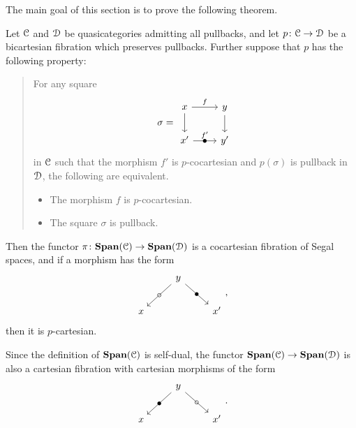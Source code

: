 \documentclass[main.tex]{subfiles}
\begin{document}
The main goal of this section is to prove the following theorem.

\begin{theorem}
  \label{thm:span_of_bicartesian_fibration_is_bicartesian_fibration}
  Let $\mathcal{C}$ and $\mathcal{D}$ be quasicategories admitting all pullbacks, and let $p\colon \mathcal{C} \to \mathcal{D}$ be a bicartesian fibration which preserves pullbacks. Further suppose that $p$ has the following property:

  \begin{quote}
    For any square
    \begin{equation*}
      \sigma =
      \begin{tikzcd}
        x
        \arrow[r, "f"]
        \arrow[d]
        & y
        \arrow[d]
        \\
        x'
        \arrow[r, "f'", "\bullet" marking]
        & y'
      \end{tikzcd}
    \end{equation*}
    in $\mathcal{C}$ such that the morphism $f'$ is $p$-cocartesian and $p(\sigma)$ is pullback in $\mathcal{D}$, the following are equivalent.
    \begin{itemize}
      \item The morphism $f$ is $p$-cocartesian.

      \item The square $\sigma$ is pullback.
    \end{itemize}
  \end{quote}

  Then the functor $\pi\colon \mathbf{Span}(\mathcal{C}) \to \mathbf{Span}(\mathcal{D})$ is a cocartesian fibration of Segal spaces, and if a morphism has the form
  \begin{equation*}
    \begin{tikzcd}
      & y
      \arrow[dl, "\circ" marking]
      \arrow[dr, "\bullet" marking]
      \\
      x
      && x'
    \end{tikzcd},
  \end{equation*}
  then it is $p$-cartesian.
\end{theorem}

\begin{note}
  Since the definition of $\mathbf{Span}(\mathcal{C})$ is self-dual, the functor $\mathbf{Span}(\mathcal{C}) \to \mathbf{Span}(\mathcal{D})$ is also a cartesian fibration with cartesian morphisms of the form
  \begin{equation*}
    \begin{tikzcd}
      & y
      \arrow[dl, "\bullet" marking]
      \arrow[dr, "\circ" marking]
      \\
      x
      && x'
    \end{tikzcd}.
  \end{equation*}
\end{note}
\end{document}
